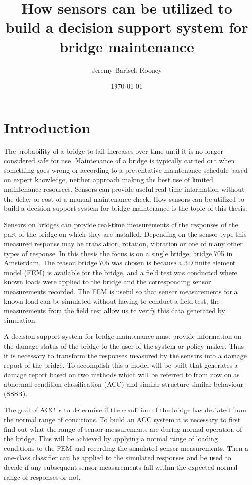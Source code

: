 \documentclass[11pt]{article}
\author{Jeremy Barisch-Rooney}
\date{\today}
\title{How sensors can be utilized to build a decision support system for bridge maintenance}
\begin{document}
\maketitle
\tableofcontents


\section{Introduction}
\label{sec:orgb707bef}
The probability of a bridge to fail increases over time until it is no longer
considered safe for use. Maintenance of a bridge is typically carried out
when something goes wrong or according to a preventative maintenance schedule
based on expert knowledge, neither approach making the best use of limited
maintenance resources. Sensors can provide useful real-time information
without the delay or cost of a manual maintenance check. How sensors can be
utilized to build a decision support system for bridge maintenance is the
topic of this thesis.

Sensors on bridges can provide real-time measurements of the responses of the
part of the bridge on which they are installed. Depending on the sensor-type
this measured response may be translation, rotation, vibration or one of many
other types of response. In this thesis the focus is on a single bridge,
bridge 705 in Amsterdam. The reason bridge 705 was chosen is because a 3D
finite element model (FEM) is available for the bridge, and a field test was
conducted where known loads were applied to the bridge and the corresponding
sensor measurements recorded. The FEM is useful so that sensor measurements
for a known load can be simulated without having to conduct a field test, the
measurements from the field test allow us to verify this data generated by
simulation.

A decision support system for bridge maintenance must provide information on
the damage status of the bridge to the user of the system or policy maker.
Thus it is necessary to transform the responses measured by the sensors into
a damage report of the bridge. To accomplish this a model will be built that
generates a damage report based on two methods which will be referred to from
now on as abnormal condition classification (ACC) and similar structure
similar behaviour (SSSB).

The goal of ACC is to determine if the condition of the bridge has deviated
from the normal range of conditions. To build an ACC system it is necessary
to first find out what the range of sensor measurements are during normal
operation of the bridge. This will be achieved by applying a normal range of
loading conditions to the FEM and recording the simulated sensor
measurements. Then a one-class classifier can be applied to the simulated
responses and be used to decide if any subsequent sensor measurements fall
within the expected normal range of responses or not.
\end{document}
